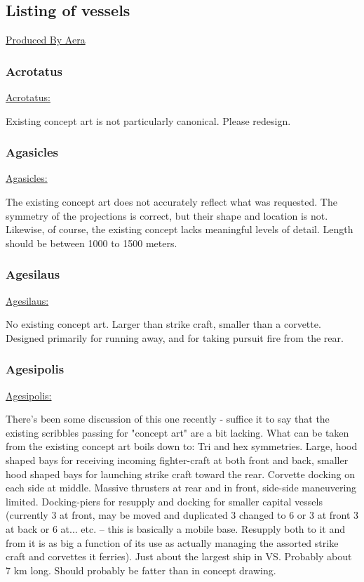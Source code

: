\subsection{Listing of vessels}

\href{https://wiki.vega-strike.org/Category:Produced_By:Aera}{Produced By Aera}

\subsubsection{Acrotatus}
\href{http://vegastrike.sourceforge.net/wiki/Vessel:Acrotatus}{Acrotatus:} 

Existing concept art is not particularly canonical. Please redesign.


\subsubsection{Agasicles}
\href{http://vegastrike.sourceforge.net/wiki/Vessel:Agasicles}{Agasicles:}

The existing concept art does not accurately reflect what was
requested. The symmetry of the projections is correct, but their shape
and location is not. Likewise, of course, the existing concept lacks
meaningful levels of detail. Length should be between 1000 to 1500
meters.

\subsubsection{Agesilaus}
\href{http://vegastrike.sourceforge.net/wiki/Vessel:Agesilaus}{Agesilaus:}

No existing concept art. Larger than strike craft, smaller than a
corvette. Designed primarily for running away, and for taking pursuit
fire from the rear.

\subsubsection{Agesipolis}
\href{http://vegastrike.sourceforge.net/wiki/Vessel:Agesipolis}{Agesipolis:}

There's been some discussion of this one recently - suffice it to say
that the existing scribbles passing for "concept art" are a bit
lacking. What can be taken from the existing concept art boils down
to: Tri and hex symmetries. Large, hood shaped bays for receiving
incoming fighter-craft at both front and back, smaller hood shaped
bays for launching strike craft toward the rear. Corvette docking on
each side at middle. Massive thrusters at rear and in front, side-side
maneuvering limited. Docking-piers for resupply and docking for
smaller capital vessels (currently 3 at front, may be moved and
duplicated 3 changed to 6 or 3 at front 3 at back or 6 at... etc. -- this is
basically a mobile base. Resupply both to it and from it is as big a
function of its use as actually managing the assorted strike craft and
corvettes it ferries). Just about the largest ship in VS. Probably
about 7 km long. Should probably be fatter than in concept drawing.


